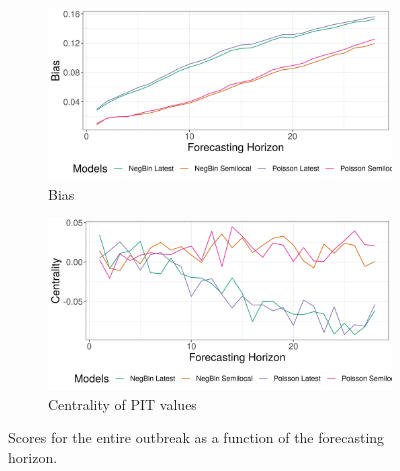 \begin{figure}[H]
\begin{subfigure}{0.5\textwidth}
  \centering
  \includegraphics[width=\linewidth]{../output/Rwampara_bias.png}  
  \caption{Bias}
  \label{fig:sub-third}
\end{subfigure}
\begin{subfigure}{0.5\textwidth}
  \centering
  \includegraphics[width=\linewidth]{../output/Rwampara_centrality.png}  
  \caption{Centrality of PIT values}
  \label{fig:nat_scores_4}
\end{subfigure}
  \caption{Scores for the entire outbreak as a function of the forecasting horizon.}

  \label{fig:nat_scores}
\end{figure}
